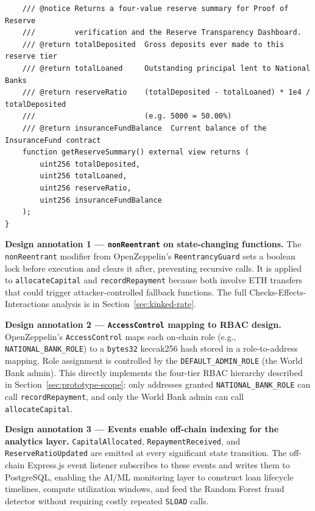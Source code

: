 \documentclass[12pt,a4paper]{report}
\begin{document}
\begin{lstlisting}
    /// @notice Returns a four-value reserve summary for Proof of Reserve
    ///         verification and the Reserve Transparency Dashboard.
    /// @return totalDeposited  Gross deposits ever made to this reserve tier
    /// @return totalLoaned     Outstanding principal lent to National Banks
    /// @return reserveRatio    (totalDeposited - totalLoaned) * 1e4 / totalDeposited
    ///                         (e.g. 5000 = 50.00%)
    /// @return insuranceFundBalance  Current balance of the InsuranceFund contract
    function getReserveSummary() external view returns (
        uint256 totalDeposited,
        uint256 totalLoaned,
        uint256 reserveRatio,
        uint256 insuranceFundBalance
    );
}
\end{lstlisting}

\textbf{Design annotation 1 --- \texttt{nonReentrant} on state-changing functions.}
The \texttt{nonReentrant} modifier from OpenZeppelin's \texttt{ReentrancyGuard} sets a boolean lock before execution and clears it after, preventing recursive calls. It is applied to \texttt{allocateCapital} and \texttt{recordRepayment} because both involve ETH transfers that could trigger attacker-controlled fallback functions. The full Checks-Effects-Interactions analysis is in Section~\ref{sec:kinked-rate}.

\textbf{Design annotation 2 --- \texttt{AccessControl} mapping to RBAC design.}
OpenZeppelin's \texttt{AccessControl} maps each on-chain role (e.g., \texttt{NATIONAL\_BANK\_ROLE}) to a \texttt{bytes32} keccak256 hash stored in a role-to-address mapping. Role assignment is controlled by the \texttt{DEFAULT\_ADMIN\_ROLE} (the World Bank admin). This directly implements the four-tier RBAC hierarchy described in Section~\ref{sec:prototype-scope}: only addresses granted \texttt{NATIONAL\_BANK\_ROLE} can call \texttt{recordRepayment}, and only the World Bank admin can call \texttt{allocateCapital}.

\textbf{Design annotation 3 --- Events enable off-chain indexing for the analytics layer.}
\texttt{CapitalAllocated}, \texttt{RepaymentReceived}, and \texttt{ReserveRatioUpdated} are emitted at every significant state transition. The off-chain Express.js event listener subscribes to these events and writes them to PostgreSQL, enabling the AI/ML monitoring layer to construct loan lifecycle timelines, compute utilization windows, and feed the Random Forest fraud detector without requiring costly repeated \texttt{SLOAD} calls.

\end{document}
